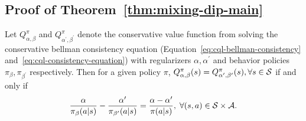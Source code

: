 \subsection{Proof of Theorem~\ref{thm:mixing-dip-main}}
\label{appendix:proof:mixing-dip-main}
\begin{theorem}
Let $Q^\pi_{\alpha,\beta}$ and $Q^\pi_{\alpha^\prime,\beta^\prime}$ denote the conservative value function from solving the conservative bellman consistency equation (Equation~\ref{eq:cql-bellman-consistency} and~\ref{eq:cql-consistency-equation}) with regularizers $\alpha,\alpha^\prime$ and behavior policies $\pi_\beta,\pi_{\beta^\prime}$ respectively. Then for a given policy $\pi$, $Q^\pi_{\alpha,\beta}(s) = Q^\pi_{\alpha^\prime,\beta^\prime}(s),\forall s\in \mathcal S$ if and only if
\begin{equation}
    \frac{\alpha}{\pi_\beta(a|s)}-\frac{\alpha^\prime}{\pi_{\beta^\prime}(a|s)}=\frac{\alpha-\alpha^\prime}{\pi(a|s)},\;\forall (s,a)\in \mathcal S\times \mathcal A.
\end{equation}
\end{theorem}

